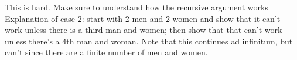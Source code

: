\item This is hard. Make sure to understand how the recursive argument 
works Explanation of case 2: start with 2 men and 2 women and show that it 
can’t work unless there is a third man and women; then show that that 
can’t work unless there’s a 4th man and woman. Note that this continues 
ad infinitum, but can’t since there are a finite number of men and women.
